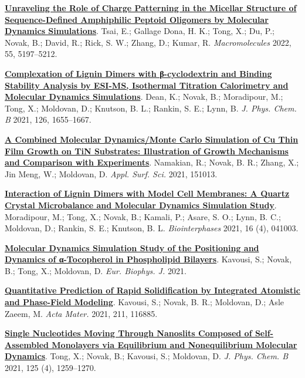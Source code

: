 
\begin{cventries}
  \cventry
    {} %
    {} %
    {} %
    {} %
    {
      \begin{cvitems} %
        \item{\href{https://doi.org/10.1021/acs.macromol.2c00141}{\textbf{Unraveling the Role of Charge Patterning in the Micellar Structure of Sequence-Defined Amphiphilic Peptoid Oligomers by Molecular Dynamics Simulations}}. Tsai, E.; Gallage Dona, H. K.; Tong, X.; Du, P.; Novak, B.; David, R.; Rick, S. W.; Zhang, D.; Kumar, R. \textit{Macromolecules} 2022, 55, 5197–5212.}
        \item{\href{https://doi.org/10.1021/acs.jpcb.1c09190}{\textbf{Complexation of Lignin Dimers with β-cyclodextrin and Binding Stability Analysis by ESI-MS, Isothermal Titration Calorimetry and Molecular Dynamics Simulations}}. Dean, K.; Novak, B.; Moradipour, M.; Tong, X.; Moldovan, D.; Knutson, B. L.; Rankin, S. E.; Lynn, B. \textit{J. Phys. Chem. B} 2021, 126, 1655–1667.}
        \item{\href{https://www.sciencedirect.com/science/article/abs/pii/S0169433221020705}{\textbf{A Combined Molecular Dynamics/Monte Carlo Simulation of Cu Thin Film Growth on TiN Substrates: Illustration of Growth Mechanisms and Comparison with Experiments}}. Namakian, R.; Novak, B. R.; Zhang, X.; Jin Meng, W.; Moldovan, D. \textit{Appl. Surf. Sci.} 2021, 151013.}
        \item{\href{https://doi.org/10.1116/6.0001029}{\textbf{Interaction of Lignin Dimers with Model Cell Membranes: A Quartz Crystal Microbalance and Molecular Dynamics Simulation Study}}. Moradipour, M.; Tong, X.; Novak, B.; Kamali, P.; Asare, S. O.; Lynn, B. C.; Moldovan, D.; Rankin, S. E.; Knutson, B. L. \textit{Biointerphases} 2021, 16 (4), 041003.}
        \item {\href{https://rdcu.be/clAtY}{\textbf{Molecular Dynamics Simulation Study of the Positioning and Dynamics of α-Tocopherol in Phospholipid Bilayers}}. Kavousi, S.; Novak, B.; Tong, X.; Moldovan, D. \textit{Eur. Biophys. J.} 2021.}
        \item{\href{https://doi.org/10.1016/j.actamat.2021.116885}{\textbf{Quantitative Prediction of Rapid Solidification by Integrated Atomistic and Phase-Field Modeling}}. Kavousi, S.; Novak, B. R.; Moldovan, D.; Asle Zaeem, M. \textit{Acta Mater.} 2021, 211, 116885.}
        \item {\href{https://doi.org/10.1021/acs.jpcb.0c07797}{\textbf{Single Nucleotides Moving Through Nanoslits Composed of Self-Assembled Monolayers via Equilibrium and Nonequilibrium Molecular Dynamics}}. Tong, X.; Novak, B.; Kavousi, S.; Moldovan, D. \textit{J. Phys. Chem. B} 2021, 125 (4), 1259–1270.}

\end{cvitems}}
\end{cventries}
